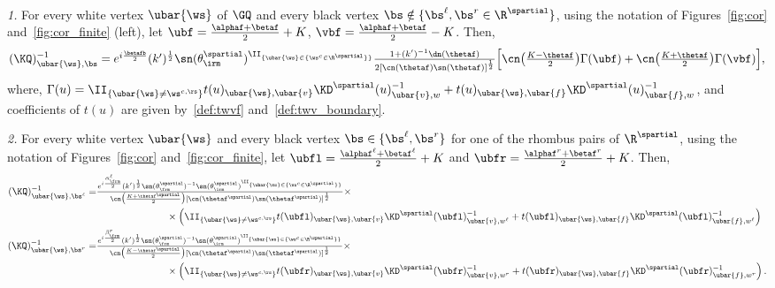 \documentclass[a4paper,twoside,11pt]{article}
\begin{document}
\begin{cor}\label{cor:BoltzmannGQ_GD}$\,$

\emph{1.} For every white vertex $\ubar{\ws}$ of $\GQ$ and every black vertex $\bs\notin\{\bs^\ell,\bs^r\in\R^{\spartial}\}$,
using the notation of Figures~\ref{fig:cor} and~\ref{fig:cor_finite} (left), let
$\ubf=\frac{\alphaf+\betaf}{2}+K$, $\vbf=\frac{\alphaf+\betaf}{2}-K$. Then,
\begin{equation*}
\textstyle
(\KQ)^{-1}_{\ubar{\ws},\bs}=e^{i\frac{\betafb}{2}}(k')^{\frac{1}{2}}\sn(\theta^{\spartial}_\irm)^{\II_{\{\ubar{\ws}\in\{\ws^c\in\R^\spartial\}\}}}
\frac{1+(k')^{-1}\dn(\thetaf)}{2[\cn(\thetaf)\sn(\thetaf)]^{\frac{1}{2}}}
\Bigl[\cn\bigl(\frac{K-\thetaf}{2}\bigr)\Gamma(\ubf)+ \cn\bigl(\frac{K+\thetaf}{2}\bigr)\Gamma(\vbf)\Bigr],
\end{equation*}
where, $\Gamma(u)=\II_{\{\ubar{\ws}\neq \ws^{c,\rs}\}}
t(u)_{\ubar{\ws},\ubar{v}}\KD^\spartial(u)^{-1}_{\ubar{v},w}+t(u)_{\ubar{\ws},\ubar{f}}\KD^\spartial(u)^{-1}_{\ubar{f},w}$, and coefficients 
of $t(u)$ are given by~\eqref{def:twvf} and~\eqref{def:twv_boundary}.

\emph{2.} For every white vertex $\ubar{\ws}$ and every black vertex $\bs\in\{\bs^\ell,\bs^r\}$ for one of the rhombus pairs of $\R^{\spartial}$,
using the notation of Figures~\ref{fig:cor} and~\ref{fig:cor_finite}, let $\ubfl=\frac{\alphaf^\ell+\betaf^\ell}{2}+K$ and 
$\ubfr=\frac{\alphaf^r+\betaf^r}{2}+K$. Then, 
\begin{align*}
\textstyle
(\KQ)^{-1}_{\ubar{\ws},\bs^\ell}
=&\textstyle
\frac{e^{i\frac{\bar{\alpha}^\ell_\frm}{2}}(k')^{\frac{1}{2}}\sn(\theta^\spartial_\frm)^{-1}\sn(\theta^{\spartial}_\irm)^{\II_{\{\ubar{\ws}\in\{\ws^c\in\R^\spartial\}\}}}
}{\cn\bigl(\frac{K+\thetaf^\spartial}{2}\bigr)[\cn(\thetaf^\spartial)\sn(\thetaf^\spartial)]^{\frac{1}{2}}}\times\\
&\hspace{2.5cm}\times\left(\II_{\{\ubar{\ws}\neq \ws^{c,\rs}\}}
t(\ubfl)_{\ubar{\ws},\ubar{v}}\KD^\spartial(\ubfl)^{-1}_{\ubar{v},w^\ell}+t(\ubfl)_{\ubar{\ws},\ubar{f}}\KD^\spartial(\ubfl)^{-1}_{\ubar{f},w^\ell}\right)\\
\textstyle
(\KQ)^{-1}_{\ubar{\ws},\bs^r}\textstyle
=&\textstyle \frac{e^{i\frac{\bar{\beta}^r_\frm}{2}}(k')^{\frac{1}{2}}\sn(\theta^\spartial_\frm)^{-1}\sn(\theta^{\spartial}_\irm)^{\II_{\{\ubar{\ws}\in\{\ws^c\in\R^\spartial\}\}}}
}{\cn\bigl(\frac{K-\thetaf^\spartial}{2}\bigr)[\cn(\thetaf^\spartial)\sn(\thetaf^\spartial)]^{\frac{1}{2}}}\times\\
&\hspace{2.5cm}\times \left(\II_{\{\ubar{\ws}\neq \ws^{c,\rs}\}}
t(\ubfr)_{\ubar{\ws},\ubar{v}}\KD^\spartial(\ubfr)^{-1}_{\ubar{v},w^r}+t(\ubfr)_{\ubar{\ws},\ubar{f}}\KD^\spartial(\ubfr)^{-1}_{\ubar{f},w^r}\right).
\end{align*}
\end{cor}
\end{document}
